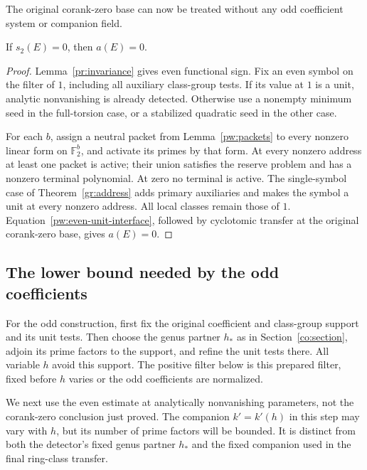 The original corank-zero base can now be treated without any odd
coefficient system or companion field.

\begin{proposition}\label{pw:even-base}
If $s_2(E)=0$, then $a(E)=0$.
\end{proposition}

\begin{proof}
Lemma~\ref{pr:invariance} gives even functional sign.  Fix an even symbol
on the filter of $1$, including all auxiliary class-group tests.  If its
value at $1$ is a unit, analytic nonvanishing is already detected.
Otherwise use a nonempty minimum seed in the full-torsion case, or a
stabilized quadratic seed in the other case.

For each $b$, assign a neutral packet from Lemma~\ref{pw:packets} to
every nonzero linear form on $\mathbb F_2^b$, and activate its primes
by that form.  At every nonzero address at least one packet is active;
their union satisfies the reserve problem and has a nonzero terminal
polynomial.  At zero no terminal is active.  The single-symbol case of
Theorem~\ref{gr:address} adds primary auxiliaries and makes the symbol a
unit at every nonzero address.  All local classes remain those of $1$.
Equation~\eqref{pw:even-unit-interface}, followed by cyclotomic transfer
at the original corank-zero base, gives $a(E)=0$.
\end{proof}

\subsection{The lower bound needed by the odd coefficients}
\label{pw:odd-lower-section}

For the odd construction, first fix the original coefficient and
class-group support and its unit tests.  Then choose the genus partner
$h_*$ as in Section~\ref{co:section}, adjoin its prime factors to the
support, and refine the unit tests there.  All variable $h$ avoid this
support.  The positive filter below is this prepared filter, fixed before
$h$ varies or the odd coefficients are normalized.

We next use the even estimate at analytically nonvanishing parameters,
not the corank-zero conclusion just proved.  The companion $k'=k'(h)$
in this step may vary with $h$, but its number of prime factors will be
bounded.  It is distinct from both the detector's fixed genus partner
$h_*$ and the fixed companion used in the final ring-class transfer.

